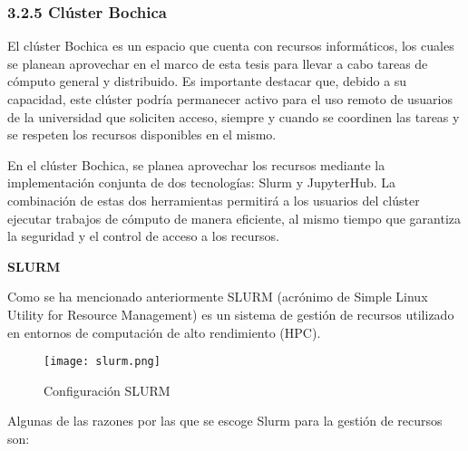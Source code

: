 \begin{spacing}{1.5}
  \subsubsection{3.2.5 Clúster Bochica}

  El clúster Bochica es un espacio que cuenta con recursos informáticos, los cuales se planean aprovechar en el marco de esta tesis para llevar a cabo tareas de cómputo general y distribuido. Es importante destacar que, debido a su capacidad, este clúster podría permanecer activo para el uso remoto de usuarios de la universidad que soliciten acceso, siempre y cuando se coordinen las tareas y se respeten los recursos disponibles en el mismo.

  En el clúster Bochica, se planea aprovechar los recursos mediante la implementación conjunta de dos tecnologías: Slurm y JupyterHub. La combinación de estas dos herramientas permitirá a los usuarios del clúster ejecutar trabajos de cómputo de manera eficiente, al mismo tiempo que garantiza la seguridad y el control de acceso a los recursos.

  \textbf{SLURM}

  Como se ha mencionado anteriormente SLURM (acrónimo de Simple Linux Utility for Resource Management) es un sistema de gestión de recursos utilizado en entornos de computación de alto rendimiento (HPC). 
  
  \begin{figure}[h]
      \centering
      \texttt{[image: slurm.png]}
      \caption{Configuración SLURM}
      \label{fig:etiqueta}
    \end{figure}
  
  Algunas de las razones por las que se escoge Slurm para la gestión de recursos son:\cite{RHEL-SLURM-1}



\end{spacing}
